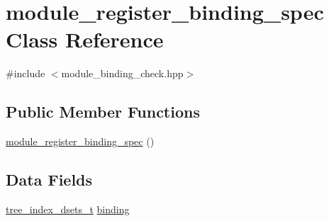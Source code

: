 \hypertarget{classmodule__register__binding__spec}{}\section{module\+\_\+register\+\_\+binding\+\_\+spec Class Reference}
\label{classmodule__register__binding__spec}


{\ttfamily \#include $<$module\+\_\+binding\+\_\+check.\+hpp$>$}

\subsection*{Public Member Functions}
\begin{DoxyCompactItemize}
\item 
\hyperlink{classmodule__register__binding__spec_a506bc1bf96f01a60704444cae575adf8}{module\+\_\+register\+\_\+binding\+\_\+spec} ()
\end{DoxyCompactItemize}
\subsection*{Data Fields}
\begin{DoxyCompactItemize}
\item 
\hyperlink{classmodule__register__binding__spec_a26171ae8c88c4fe1a5397cdd47d417e3}{tree\+\_\+index\+\_\+dsets\+\_\+t} \hyperlink{classmodule__register__binding__spec_a56a940aea2a81fb2095dac64d1c6c510}{binding}
\end{DoxyCompactItemize}
